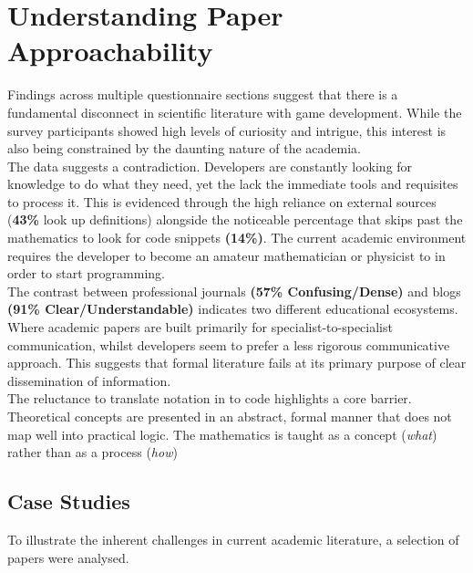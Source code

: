 \chapter{Understanding Paper Approachability}

Findings across multiple questionnaire sections suggest that there is a fundamental disconnect in scientific literature with game development.
While the survey participants showed high levels of curiosity and intrigue, this interest is also being constrained by the daunting nature of the academia. \\

The data suggests a contradiction. Developers are constantly looking for knowledge to do what they need, yet the lack the
immediate tools and requisites to process it. This is evidenced through the high reliance on external sources {(\textbf{43\%} look up definitions)}
alongside the noticeable percentage that skips past the mathematics to look for code snippets \textbf{(14\%)}.
The current academic environment requires the developer to become an amateur mathematician or physicist to in order to start programming. \\

The contrast between professional journals \textbf{(57\% Confusing/Dense)} and blogs \\ \textbf{(91\% Clear/Understandable)} indicates two different educational ecosystems.
Where academic papers are built primarily for specialist-to-specialist communication, whilst developers seem to prefer a less rigorous communicative approach.
This suggests that formal literature fails at its primary purpose of clear dissemination of information. \\

The reluctance to translate notation in to code highlights a core barrier. Theoretical concepts are presented in an abstract, formal manner that does not map
well into practical logic. The mathematics is taught as a concept (\textit{what}) rather than as a process (\textit{how})

\section{Case Studies}

To illustrate the inherent challenges in current academic literature, a selection of papers were analysed.

\subsection{}

